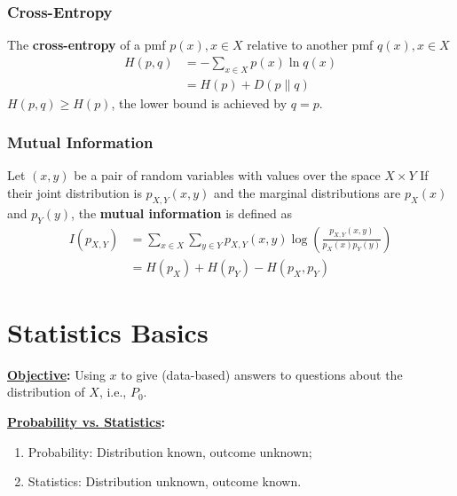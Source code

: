 \documentclass[11pt]{elegantbook}
\begin{document}
\subsection{Cross-Entropy}
\begin{definition}
    The \textbf{cross-entropy} of a pmf $p(x),x\in X$ relative to another pmf $q(x), x\in X$
    \begin{equation}
        \begin{aligned}
            H(p, q)&=-\sum_{x\in X}p(x)\ln q(x)\\&=H(p)+D(p\| q)
        \end{aligned}
        \nonumber
    \end{equation}
    $H(p,q)\geq H(p)$, the lower bound is achieved by $q=p$.
\end{definition}

\subsection{Mutual Information}
\begin{definition}
    Let $(x,y)$ be a pair of random variables with values over the space $X\times Y$ If their joint distribution is $p_{X,Y}(x,y)$ and the marginal distributions are $p_X(x)$ and $p_Y(y)$, the \textbf{mutual information} is defined as
    \begin{equation}
        \begin{aligned}
            I(p_{X,Y})&=\sum_{x\in X}\sum_{y\in Y}p_{X,Y}(x,y)\log\left(\frac{p_{X,Y}(x,y)}{p_X(x)p_Y(y)}\right)\\
            &=H(p_X)+H(p_Y)-H(p_X,p_Y)
        \end{aligned}
        \nonumber
    \end{equation}
\end{definition}


\chapter{Statistics Basics}
\textbf{\underline{Objective}:} Using $x$ to give (data-based) answers to questions about the distribution of $X$, i.e., $P_0$.

\textbf{\underline{Probability vs. Statistics}:}
\begin{enumerate}[$\circ$]
    \item Probability: Distribution known, outcome unknown;
    \item Statistics: Distribution unknown, outcome known.
\end{enumerate}
\end{document}
